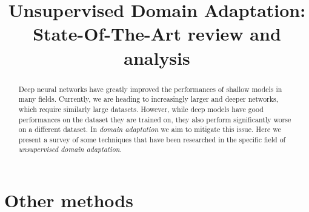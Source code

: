 \documentclass[conference]{IEEEtran}
\begin{document}
\title{Unsupervised Domain Adaptation:\\State-Of-The-Art review and analysis}

\author{
    \and
    \and
    \and
    \and
}


\maketitle

\thispagestyle{plain}
\pagestyle{plain}

\begin{abstract}
Deep neural networks have greatly improved the performances of shallow models in many fields. Currently, we are heading to increasingly larger and deeper networks, which require similarly large datasets. However, while deep models have good performances on the dataset they are trained on, they also perform significantly worse on a different dataset. In \emph{domain adaptation} we aim to mitigate this issue. Here we present a survey of some techniques that have been researched in the specific field of \emph{unsupervised domain adaptation}.
\end{abstract}





\section{Other methods}








{}

\end{document}
